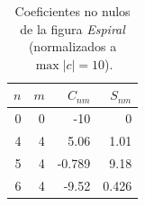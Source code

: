 \begin{table}[htbp]
\centering
\small
\caption{Coeficientes no nulos de la figura \emph{Espiral} (normalizados a $\max|c| = 10$).}
\label{tab:coef-espiral}
\begin{tabular}{rrrr}
\hline
$n$ & $m$ & $C_{nm}$ & $S_{nm}$ \\
\hline
0 & 0 & -10 & 0 \\
4 & 4 & 5.06 & 1.01 \\
5 & 4 & -0.789 & 9.18 \\
6 & 4 & -9.52 & 0.426 \\
\hline
\end{tabular}
\end{table}
